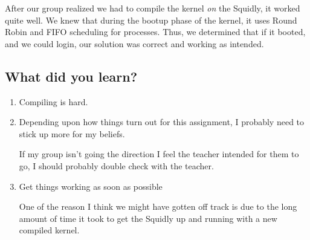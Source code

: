 \documentclass[letterpaper,10pt,titlepage]{article}
\begin{document}
After our group realized we had to compile the kernel \emph{on} the
Squidly, it worked quite well. We knew that during the bootup
phase of the kernel, it uses Round Robin and FIFO scheduling for
processes. Thus, we determined that if it booted, and we could login,
our solution was correct and working as intended.

\subsection*{What did you learn?}

\begin{enumerate}
    \item Compiling is hard.

    \item Depending upon how things turn out for this assignment, I
probably need to stick up more for my beliefs.

If my group isn't going the direction I feel the teacher intended for
them to go, I should probably double check with the teacher.

    \item Get things working as soon as possible

One of the reason I think we might have gotten off track is due to the
long amount of time it took to get the Squidly up and running with a new
compiled kernel.

\end{enumerate}
\end{document}

